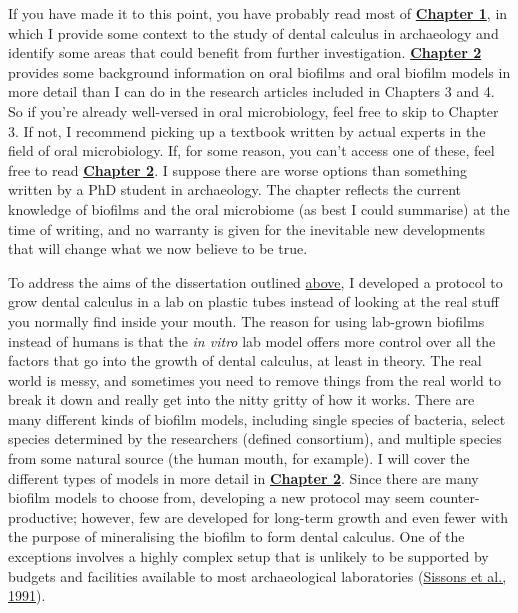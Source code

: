 \documentclass[
  b5paper,
]{book}
\begin{document}
If you have made it to this point, you have probably read most of
\protect\hyperlink{chap-intro}{\textbf{Chapter 1}}, in which I provide
some context to the study of dental calculus in archaeology and identify
some areas that could benefit from further investigation.
\protect\hyperlink{chap-background}{\textbf{Chapter 2}} provides some
background information on oral biofilms and oral biofilm models in more
detail than I can do in the research articles included in Chapters 3 and
4. So if you're already well-versed in oral microbiology, feel free to
skip to Chapter 3. If not, I recommend picking up a textbook written by
actual experts in the field of oral microbiology. If, for some reason,
you can't access one of these, feel free to read
\protect\hyperlink{chap-background}{\textbf{Chapter 2}}. I suppose there
are worse options than something written by a PhD student in
archaeology. The chapter reflects the current knowledge of biofilms and
the oral microbiome (as best I could summarise) at the time of writing,
and no warranty is given for the inevitable new developments that will
change what we now believe to be true.

To address the aims of the dissertation outlined
\protect\hyperlink{intro-aims}{above}, I developed a protocol to grow
dental calculus in a lab on plastic tubes instead of looking at the real
stuff you normally find inside your mouth. The reason for using
lab-grown biofilms instead of humans is that the \emph{in vitro} lab
model offers more control over all the factors that go into the growth
of dental calculus, at least in theory. The real world is messy, and
sometimes you need to remove things from the real world to break it down
and really get into the nitty gritty of how it works. There are many
different kinds of biofilm models, including single species of bacteria,
select species determined by the researchers (defined consortium), and
multiple species from some natural source (the human mouth, for
example). I will cover the different types of models in more detail in
\protect\hyperlink{background}{\textbf{Chapter 2}}. Since there are many
biofilm models to choose from, developing a new protocol may seem
counter-productive; however, few are developed for long-term growth and
even fewer with the purpose of mineralising the biofilm to form dental
calculus. One of the exceptions involves a highly complex setup that is
unlikely to be supported by budgets and facilities available to most
archaeological laboratories
(\protect\hyperlink{ref-sissonsMultistationPlaque1991}{Sissons et al.,
1991}).
\end{document}
